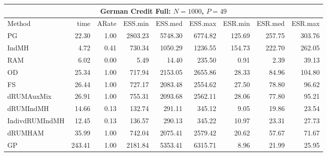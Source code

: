 \begin{table}
\begin{tabular}{l r r r r r r r r } 
\hline
\multicolumn{9}{c}{German Credit Full: $N = 1000$, $P=49$} \\
\hline
          Method  &     time &    ARate &  ESS.min &  ESS.med &  ESS.max &  ESR.min &  ESR.med &  ESR.max \\ 
              PG  &    22.30 &     1.00 &  2803.23 &  5748.30 &  6774.82 &   125.69 &   257.75 &   303.76 \\ 
           IndMH  &     4.72 &     0.41 &   730.34 &  1050.29 &  1236.55 &   154.73 &   222.70 &   262.05 \\ 
             RAM  &     6.02 &     0.00 &     5.49 &    14.40 &   235.50 &     0.91 &     2.39 &    39.13 \\ 
              OD  &    25.34 &     1.00 &   717.94 &  2153.05 &  2655.86 &    28.33 &    84.96 &   104.80 \\ 
              FS  &    26.44 &     1.00 &   727.17 &  2083.48 &  2554.62 &    27.50 &    78.80 &    96.62 \\ 
      dRUMAuxMix  &    26.91 &     1.00 &   755.31 &  2093.68 &  2562.11 &    28.06 &    77.80 &    95.21 \\ 
       dRUMIndMH  &    14.66 &     0.13 &   132.74 &   291.11 &   345.12 &     9.05 &    19.86 &    23.54 \\ 
  IndivdRUMIndMH  &    12.45 &     0.13 &   136.57 &   290.13 &   345.22 &    10.97 &    23.31 &    27.73 \\ 
         dRUMHAM  &    35.99 &     1.00 &   742.04 &  2075.41 &  2579.42 &    20.62 &    57.67 &    71.67 \\ 
              GP  &   243.41 &     1.00 &  2181.84 &  5353.41 &  6315.71 &     8.96 &    21.99 &    25.95
 \end{tabular}
\end{table}

